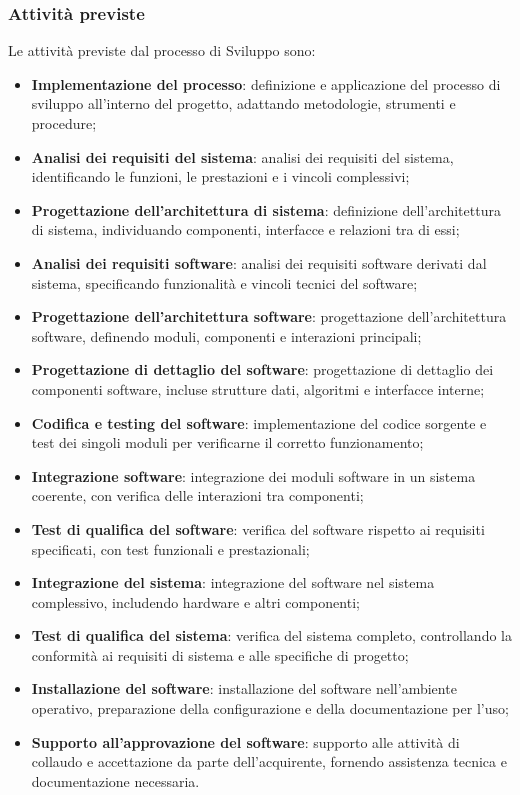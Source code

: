 \documentclass[a4paper,12pt]{article}
\begin{document}
        \subsubsection{Attività previste}
            Le attività previste dal processo di Sviluppo sono:
            \begin{itemize}
                \item \textbf{Implementazione del processo}: definizione e applicazione del processo di sviluppo all'interno del progetto, adattando metodologie, strumenti e procedure;
                \item \textbf{Analisi dei requisiti del sistema}: analisi dei requisiti del sistema, identificando le funzioni, le prestazioni e i vincoli complessivi;
                \item \textbf{Progettazione dell'architettura di sistema}: definizione dell'architettura di sistema, individuando componenti, interfacce e relazioni tra di essi;
                \item \textbf{Analisi dei requisiti software}: analisi dei requisiti software derivati dal sistema, specificando funzionalità e vincoli tecnici del software;
                \item \textbf{Progettazione dell'architettura software}: progettazione dell'architettura software, definendo moduli, componenti e interazioni principali;
                \item \textbf{Progettazione di dettaglio del software}: progettazione di dettaglio dei componenti software, incluse strutture dati, algoritmi e interfacce interne;
                \item \textbf{Codifica e testing del software}: implementazione del codice sorgente e test dei singoli moduli per verificarne il corretto funzionamento;
                \item \textbf{Integrazione software}: integrazione dei moduli software in un sistema coerente, con verifica delle interazioni tra componenti;
                \item \textbf{Test di qualifica del software}: verifica del software rispetto ai requisiti specificati, con test funzionali e prestazionali;
                \item \textbf{Integrazione del sistema}: integrazione del software nel sistema complessivo, includendo hardware e altri componenti;
                \item \textbf{Test di qualifica del sistema}: verifica del sistema completo, controllando la conformità ai requisiti di sistema e alle specifiche di progetto;
                \item \textbf{Installazione del software}: installazione del software nell'ambiente operativo, preparazione della configurazione e della documentazione per l'uso;
                \item \textbf{Supporto all'approvazione del software}: supporto alle attività di collaudo e accettazione da parte dell'acquirente, fornendo assistenza tecnica e documentazione necessaria.
            \end{itemize}
\end{document}
